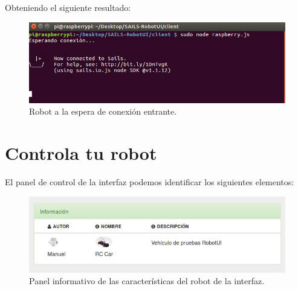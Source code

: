 Obteniendo el siguiente resultado:


\begin{figure}[H]
  \begin{center}
    \includegraphics[scale=.6]{imagenes/manual-usuario/espera-conexion.png}
  \end{center}
  \caption{ Robot a la espera de conexión entrante.}
  \label{website:pagina-principal}
\end{figure}



\section{ Controla tu robot }
\label{sec:control-robot}

El panel de control de la interfaz podemos identificar los siguientes elementos:

\begin{figure}[H]
  \begin{center}
    \includegraphics[scale=.6]{imagenes/manual-usuario/panel-robot-info.png}
  \end{center}
  \caption{ Panel informativo de las características del robot de la interfaz.}
  \label{website:pagina-principal}
\end{figure}


